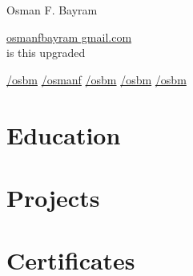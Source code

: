 \documentclass{resume-class} %
\author{Osman Faruk Bayram}
\begin{document}
\LARGE

Osman F. Bayram





\href{mailto://osmanfbayram@gmail.com}{osmanfbayram  gmail.com}\\

is this upgraded

\makesidebar

\href{http://github.com/osbm}{/osbm} \quad
{}\href{https://www.kaggle.com/osmanf}{/osmanf} \quad
{}\href{https://www.linkedin.com/in/osbm}{/osbm} \quad
{}\href{https://www.researchgate.net/profile/Osman-Faruk-Bayram}{/osbm} \quad
{}\href{https://orcid.org/0000-0002-4346-5356}{/osbm} \quad

\section{Education}

\section{Projects}

\section{Certificates}



\footer
\end{document}
